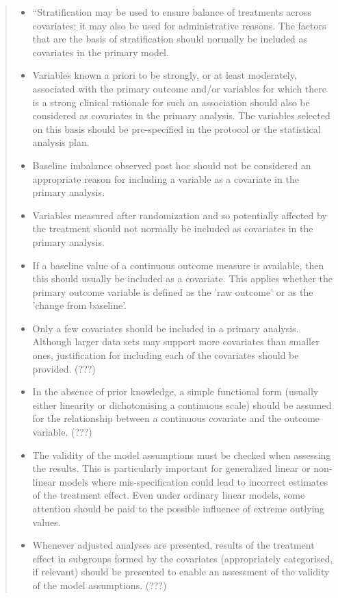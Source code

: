   \begin{quote}
    \begin{itemize}
\smaller
\item ``Stratification may be used to ensure balance of treatments across covariates; it may also be used for administrative reasons.  The factors that are the basis of stratification should normally be included as covariates in the primary model.
\item Variables known a priori to be strongly, or at least moderately, associated with the primary outcome and/or variables for which there is a strong clinical rationale for such an association should also be considered as covariates in the primary analysis.  The variables selected on this basis should be pre-specified in the protocol or the statistical analysis plan.
\item Baseline imbalance observed post hoc should not be considered an appropriate reason for including a variable as a covariate in the primary analysis.
\item Variables measured after randomization and so potentially affected by the treatment should not normally be included as covariates in the primary analysis.
\item If a baseline value of a continuous outcome measure is available, then this should usually be included as a covariate.  This applies whether the primary outcome variable is defined as the 'raw outcome' or as the 'change from baseline'.
\item Only a few covariates should be included in a primary analysis.  Although larger data sets may support more covariates than smaller ones, justification for including each of the covariates should be provided. (???)
\item In the absence of prior knowledge, a simple functional form (usually either linearity or dichotomising a continuous scale) should be assumed for the relationship between a continuous covariate and the outcome variable. (???)
\item The validity of the model assumptions must be checked when assessing the results.  This is particularly important for generalized linear or non-linear models where mis-specification could lead to incorrect estimates of the treatment effect.  Even under ordinary linear models, some attention should be paid to the possible influence of extreme outlying values.
\item Whenever adjusted analyses are presented, results of the treatment effect in subgroups formed by the covariates (appropriately categorised, if relevant) should be presented to enable an assessment of the validity of the model assumptions. (???)

\end{itemize}
\end{quote}
